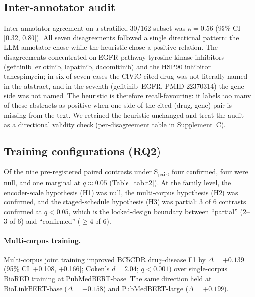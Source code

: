 \subsection{Inter-annotator audit}
\label{sec:results-iaa}

Inter-annotator agreement on a stratified 30/162 subset was
\(\kappa=0.56\) (95\% CI [0.32, 0.80]). All seven disagreements
followed a single directional pattern: the LLM annotator chose
 while the heuristic chose a positive
relation. The disagreements concentrated on EGFR-pathway
tyrosine-kinase inhibitors (gefitinib, erlotinib, lapatinib,
dacomitinib) and the HSP90 inhibitor tanespimycin; in six of seven
cases the CIViC-cited drug was not literally named in the abstract,
and in the seventh (gefitinib--EGFR, PMID 22370314) the gene side
was not named. The heuristic is therefore recall-favouring: it
labels too many of these abstracts as positive when one side of
the cited (drug, gene) pair is missing from the text. We retained
the heuristic unchanged and treat the audit as a directional
validity check (per-disagreement table in Supplement~C).

\subsection{Training configurations (RQ2)}
\label{sec:results-rq2}

Of the nine pre-registered paired contrasts under
S\textsubscript{pair}, four confirmed, four were null, and one
marginal at \(q\approx0.05\) (Table~\ref{tab:t2}). At the family
level, the encoder-scale hypothesis (H1) was null, the
multi-corpus hypothesis (H2) was confirmed, and the staged-schedule
hypothesis (H3) was partial: 3 of 6 contrasts confirmed at
\(q<0.05\), which is the locked-design boundary between
``partial'' (2--3 of 6) and ``confirmed'' (\(\ge 4\) of 6).

\paragraph{Multi-corpus training.}
Multi-corpus joint training improved BC5CDR drug--disease F1 by
\(\Delta=+0.139\) (95\% CI [+0.108, +0.166]; Cohen's \(d=2.04\);
\(q<0.001\)) over single-corpus BioRED training at PubMedBERT-base.
The same direction held at BioLinkBERT-base (\(\Delta=+0.158\)) and
PubMedBERT-large (\(\Delta=+0.199\)).

